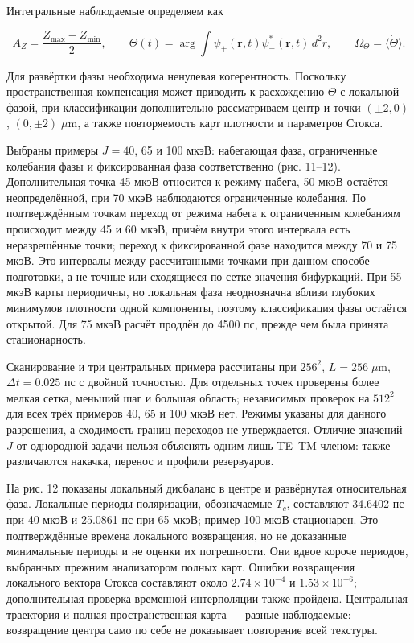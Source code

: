 \documentclass[12pt,a4paper]{article}
\begin{document}
Интегральные наблюдаемые определяем как

\[
A_Z=\frac{Z_{\max}-Z_{\min}}{2},\qquad
\Theta(t)=\arg\!\int\psi_+(\mathbf r,t)\psi_-^*(\mathbf r,t)\,d^2r,
\qquad \Omega_\Theta=\langle\dot\Theta\rangle.
\tag{21}\label{eq:21}
\]

Для развёртки фазы необходима ненулевая когерентность. Поскольку пространственная компенсация может приводить к расхождению \(\Theta\) с локальной фазой, при классификации дополнительно рассматриваем центр и точки \((\pm2,0)\), \((0,\pm2)\;\mu\mathrm m\), а также повторяемость карт плотности и параметров Стокса.

Выбраны примеры \(J=40\), 65 и 100 мкэВ: набегающая фаза, ограниченные колебания фазы и фиксированная фаза соответственно (рис. 11--12). Дополнительная точка 45 мкэВ относится к режиму набега, 50 мкэВ остаётся неопределённой, при 70 мкэВ наблюдаются ограниченные колебания. По подтверждённым точкам переход от режима набега к ограниченным колебаниям происходит между 45 и 60 мкэВ, причём внутри этого интервала есть неразрешённые точки; переход к фиксированной фазе находится между 70 и 75 мкэВ. Это интервалы между рассчитанными точками при данном способе подготовки, а не точные или сходящиеся по сетке значения бифуркаций. При 55 мкэВ карты периодичны, но локальная фаза неоднозначна вблизи глубоких минимумов плотности одной компоненты, поэтому классификация фазы остаётся открытой. Для 75 мкэВ расчёт продлён до 4500 пс, прежде чем была принята стационарность.

Сканирование и три центральных примера рассчитаны при \(256^2\), \(L=256\;\mu\mathrm m\), \(\Delta t=0.025\) пс с двойной точностью. Для отдельных точек проверены более мелкая сетка, меньший шаг и большая область; независимых проверок на \(512^2\) для всех трёх примеров 40, 65 и 100 мкэВ нет. Режимы указаны для данного разрешения, а сходимость границ переходов не утверждается. Отличие значений \(J\) от однородной задачи нельзя объяснять одним лишь TE--TM-членом: также различаются накачка, перенос и профили резервуаров.

На рис. 12 показаны локальный дисбаланс в центре и развёрнутая относительная фаза. Локальные периоды поляризации, обозначаемые \(T_c\), составляют 34.6402 пс при 40 мкэВ и 25.0861 пс при 65 мкэВ; пример 100 мкэВ стационарен. Это подтверждённые времена локального возвращения, но не доказанные минимальные периоды и не оценки их погрешности. Они вдвое короче периодов, выбранных прежним анализатором полных карт. Ошибки возвращения локального вектора Стокса составляют около \(2.74\times10^{-4}\) и \(1.53\times10^{-6}\); дополнительная проверка временной интерполяции также пройдена. Центральная траектория и полная пространственная карта --- разные наблюдаемые: возвращение центра само по себе не доказывает повторение всей текстуры.
\end{document}
